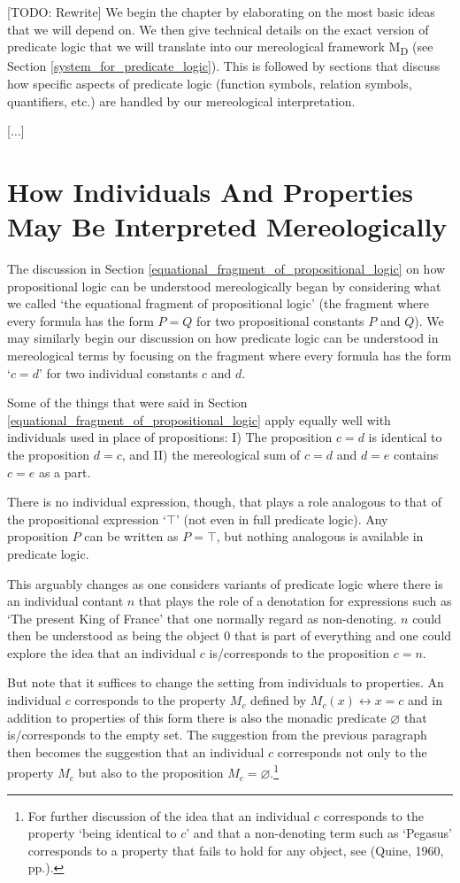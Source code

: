 \documentclass[12pt]{book}
\begin{document}
[TODO: Rewrite] We begin the chapter by elaborating on the most basic ideas that we will depend on. We then give technical details on the exact version of predicate logic that we will translate into our mereological framework M\textsubscript{D} (see Section \ref{system_for_predicate_logic}). This is followed by sections that discuss how specific aspects of predicate logic (function symbols, relation symbols, quantifiers, etc.) are handled by our mereological interpretation.

[$\ldots$]

\section{How Individuals And Properties May Be Interpreted Mereologically} \label{interpretation_of_monadic_predicates}
The discussion in Section \ref{equational_fragment_of_propositional_logic} on how propositional logic can be understood mereologically began by considering what we called `the equational fragment of propositional logic' (the fragment where every formula has the form $P = Q$ for two propositional constants $P$ and $Q$). We may similarly begin our discussion on how predicate logic can be understood in mereological terms by focusing on the fragment where every formula has the form `$c=d$' for two individual constants $c$ and $d$.

Some of the things that were said in Section \ref{equational_fragment_of_propositional_logic} apply equally well with individuals used in place of propositions: I) The proposition $c=d$ is identical to the proposition $d=c$, and II) the mereological sum of $c=d$ and $d=e$ contains $c=e$ as a part.

There is no individual expression, though, that plays a role analogous to that of the propositional expression `$\top$' (not even in full predicate logic). Any proposition $P$ can be written as $P = \top$, but nothing analogous is available in predicate logic.

This arguably changes as one considers variants of predicate logic where there is an individual contant $n$ that plays the role of a denotation for expressions such as `The present King of France' that one normally regard as non-denoting. $n$ could then be understood as being the object $0$ that is part of everything and one could explore the idea that an individual $c$ is/corresponds to the proposition $c = n$.

But note that it suffices to change the setting from individuals to properties. An individual $c$ corresponds to the property $M_c$ defined by $M_c(x) \leftrightarrow x=c$ and in addition to properties of this form there is also the monadic predicate $\varnothing$ that is/corresponds to the empty set. The suggestion from the previous paragraph then becomes the suggestion that an individual $c$ corresponds not only to the property $M_c$ but also to the proposition $M_c = \varnothing$.\footnote{For further discussion of the idea that an individual $c$ corresponds to the property `being identical to $c$' and that a non-denoting term such as `Pegasus' corresponds to a property that fails to hold for any object, see (Quine, 1960, pp.).}
\end{document}
